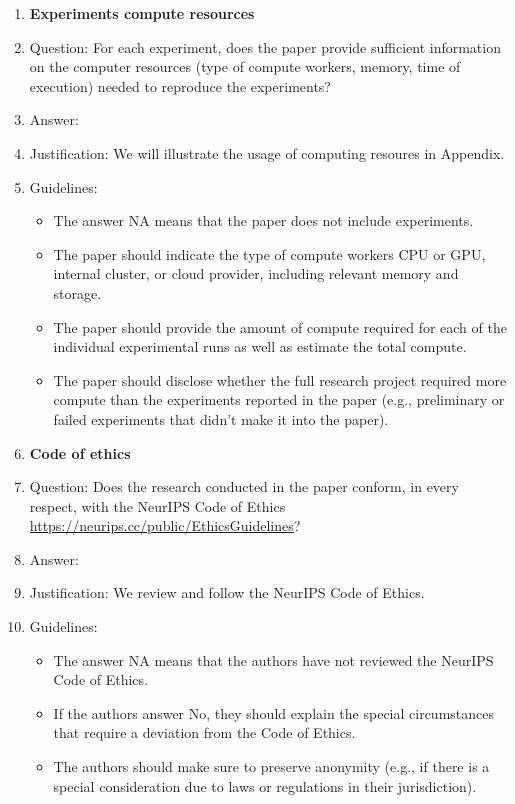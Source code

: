 \documentclass{article}
\begin{document}
\begin{enumerate}
\item {\bf Experiments compute resources}
    \item[] Question: For each experiment, does the paper provide sufficient information on the computer resources (type of compute workers, memory, time of execution) needed to reproduce the experiments?
    \item[] Answer: \answerYes{} %
    \item[] Justification: We will illustrate the usage of computing resoures in Appendix.
    \item[] Guidelines:
    \begin{itemize}
        \item The answer NA means that the paper does not include experiments.
        \item The paper should indicate the type of compute workers CPU or GPU, internal cluster, or cloud provider, including relevant memory and storage.
        \item The paper should provide the amount of compute required for each of the individual experimental runs as well as estimate the total compute. 
        \item The paper should disclose whether the full research project required more compute than the experiments reported in the paper (e.g., preliminary or failed experiments that didn't make it into the paper). 
    \end{itemize}
    
\item {\bf Code of ethics}
    \item[] Question: Does the research conducted in the paper conform, in every respect, with the NeurIPS Code of Ethics \url{https://neurips.cc/public/EthicsGuidelines}?
    \item[] Answer: \answerYes{} %
    \item[] Justification: We review and follow the NeurIPS Code of Ethics.
    \item[] Guidelines:
    \begin{itemize}
        \item The answer NA means that the authors have not reviewed the NeurIPS Code of Ethics.
        \item If the authors answer No, they should explain the special circumstances that require a deviation from the Code of Ethics.
        \item The authors should make sure to preserve anonymity (e.g., if there is a special consideration due to laws or regulations in their jurisdiction).
    \end{itemize}



\end{enumerate}
\end{document}
